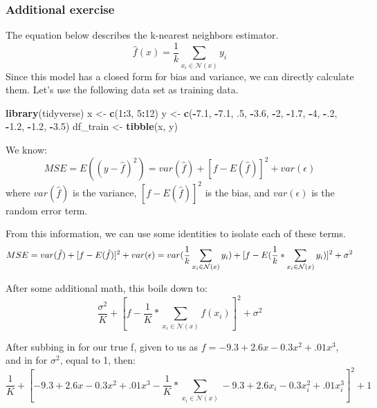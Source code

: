 \documentclass[]{article}
\newenvironment{Shaded}{\begin{snugshade}}{\end{snugshade}}
\newcommand{\KeywordTok}[1]{\textcolor[rgb]{0.13,0.29,0.53}{\textbf{#1}}}
\newcommand{\DecValTok}[1]{\textcolor[rgb]{0.00,0.00,0.81}{#1}}
\newcommand{\FloatTok}[1]{\textcolor[rgb]{0.00,0.00,0.81}{#1}}
\newcommand{\StringTok}[1]{\textcolor[rgb]{0.31,0.60,0.02}{#1}}
\newcommand{\OperatorTok}[1]{\textcolor[rgb]{0.81,0.36,0.00}{\textbf{#1}}}
\newcommand{\NormalTok}[1]{#1}
\begin{document}
\subsubsection{Additional exercise}\label{additional-exercise}

The equation below describes the k-nearest neighbors estimator.
\[\hat{f}(x) = \frac{1}{k} \sum_{x_i \in \mathcal{N}(x)} y_i\] Since
this model has a closed form for bias and variance, we can directly
calculate them. Let's use the following data set as training data.

\begin{Shaded}
\begin{Highlighting}[]
\KeywordTok{library}\NormalTok{(tidyverse)}
\NormalTok{x <-}\StringTok{ }\KeywordTok{c}\NormalTok{(}\DecValTok{1}\OperatorTok{:}\DecValTok{3}\NormalTok{, }\DecValTok{5}\OperatorTok{:}\DecValTok{12}\NormalTok{)}
\NormalTok{y <-}\StringTok{ }\KeywordTok{c}\NormalTok{(}\OperatorTok{-}\FloatTok{7.1}\NormalTok{, }\OperatorTok{-}\FloatTok{7.1}\NormalTok{, .}\DecValTok{5}\NormalTok{, }\OperatorTok{-}\FloatTok{3.6}\NormalTok{, }\OperatorTok{-}\DecValTok{2}\NormalTok{, }\OperatorTok{-}\FloatTok{1.7}\NormalTok{,}
       \OperatorTok{-}\DecValTok{4}\NormalTok{, }\OperatorTok{-}\NormalTok{.}\DecValTok{2}\NormalTok{, }\OperatorTok{-}\FloatTok{1.2}\NormalTok{, }\OperatorTok{-}\FloatTok{1.2}\NormalTok{, }\OperatorTok{-}\FloatTok{3.5}\NormalTok{)}
\NormalTok{df_train <-}\StringTok{ }\KeywordTok{tibble}\NormalTok{(x, y)}
\end{Highlighting}
\end{Shaded}

We know:
\[MSE = E((y - \hat{f})^2) = var(\hat{f}) + [f - E(\hat{f})]^2 + var(\epsilon)\]
where \(var(\hat{f})\) is the variance, \([f - E(\hat{f})]^2\) is the
bias, and \(var(\epsilon)\) is the random error term.

From this information, we can use some identities to isolate each of
these terms. \[MSE = var(\hat{f}) + [f - E(\hat{f})]^2 + var(\epsilon)\\
= var(\frac{1}{k} \sum_{x_i \in \mathcal{N}(x)} y_i) + [f - E(\frac{1}{k} * \sum_{x_i \in \mathcal{N}(x)} y_i)]^2 + \sigma^2\\\]

After some additional math, this boils down to:
\[\frac{\sigma^2}{K} + [f - \frac{1}{K} * \sum_{x_i \in \mathcal{N}(x)} f(x_i)]^2 + \sigma^2\]

After subbing in for our true f, given to us as
\(f = -9.3 + 2.6 x - 0.3 x^2 + .01 x^3\), and in for \(\sigma^2\), equal
to 1, then:
\[\frac{1}{K} + [-9.3 + 2.6 x - 0.3 x^2 + .01 x^3 - \frac{1}{K} * \sum_{x_i \in \mathcal{N}(x)} -9.3 + 2.6 x_i - 0.3 x_i^2 + .01 x_i^3]^2 + 1\]
\end{document}

